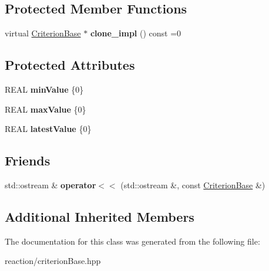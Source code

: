 \subsection*{Protected Member Functions}
\begin{DoxyCompactItemize}
\item 
\mbox{\label{classCriterionBase_a2bd52a0ff0315bc856a579e5da098b02}} 
virtual \mbox{\hyperlink{classCriterionBase}{Criterion\+Base}} $\ast$ {\bfseries clone\+\_\+impl} () const =0
\end{DoxyCompactItemize}
\subsection*{Protected Attributes}
\begin{DoxyCompactItemize}
\item 
\mbox{\label{classCriterionBase_a851fa151b02834ab9ef666e853c6555a}} 
R\+E\+AL {\bfseries min\+Value} \{0\}
\item 
\mbox{\label{classCriterionBase_a051d7dcbbe5f2fff98fdb3b4e803c7ec}} 
R\+E\+AL {\bfseries max\+Value} \{0\}
\item 
\mbox{\label{classCriterionBase_a9be56af8fb3be200caa43daf88f8d621}} 
R\+E\+AL {\bfseries latest\+Value} \{0\}
\end{DoxyCompactItemize}
\subsection*{Friends}
\begin{DoxyCompactItemize}
\item 
\mbox{\label{classCriterionBase_a1f5e9ad67c9cfd6167d9778dfef48c9d}} 
std\+::ostream \& {\bfseries operator$<$$<$} (std\+::ostream \&, const \mbox{\hyperlink{classCriterionBase}{Criterion\+Base}} \&)
\end{DoxyCompactItemize}
\subsection*{Additional Inherited Members}


The documentation for this class was generated from the following file\+:\begin{DoxyCompactItemize}
\item 
reaction/criterion\+Base.\+hpp\end{DoxyCompactItemize}
